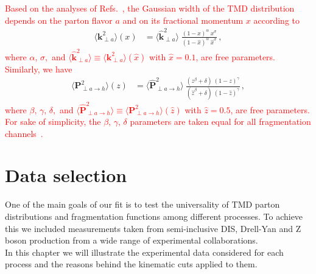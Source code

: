 \documentclass[aps,preprintnumbers,showpacs,nofootinbib,superscriptaddress,floatfix]{revtex4}
\newcommand{\T}{\perp}
\begin{document}
\textcolor{red}{Based on the analyses of Refs.~\cite{Signori:2013mda,Bacchetta:2015ora}, the Gaussian width of the TMD distribution depends on the parton flavor $a$ and on its fractional momentum $x$ according to}
\begin{align} 
\big\langle \bm{k}_{\T a}^2 \big\rangle (x) &= \big\langle \hat{\bm{k}}_{\T a}^2 \big\rangle \;  
\frac{(1-x)^{\alpha} \  x^{\sigma} }{ (1 - \hat{x})^{\alpha} \  \hat{x}^{\sigma} } \, ,
\label{e:kT2_kin}
\end{align}
\textcolor{red}{where $\alpha, \, \sigma,$ and $\big\langle \hat{\bm{k}}_{\T a}^2 \big\rangle \equiv \big\langle \bm{k}_{\T a}^2 \big\rangle (\hat{x})$ with $\hat{x} = 0.1$, are free parameters. Similarly, we have}
\begin{align}  
\big\langle \bm{P}_{\T a \to h}^2 \big\rangle (z) &= \big\langle \hat{\bm{P}}_{\T a \to h}^2 \big\rangle \  
               \frac{ (z^{\beta} + \delta)\ (1-z)^{\gamma} }{ (\hat{z}^{\beta} + \delta)\   (1 - \hat{z})^{\gamma} } \, ,
 \label{e:PT2_kin}
 \end{align}
 \textcolor{red}{where $\beta, \, \gamma, \, \delta, $ and $\big\langle \hat{\bm{P}}_{\T a \to h}^2 \big\rangle \equiv \big \langle \bm{P}_{\T a \to h}^2 \big\rangle (\hat{z})$ with $\hat{z} = 0.5$, are free parameters. For sake of simplicity, the $\beta, \, \gamma, \, \delta$ parameters are taken equal for all fragmentation channels~\cite{Signori:2013mda,Bacchetta:2015ora}. }

\section{Data selection}
\label{s:data}

One of the main goals of our fit is to test the universality of TMD parton distributions and fragmentation functions among different processes.
To achieve this we included measurements taken from semi-inclusive DIS, Drell-Yan and Z boson production from a wide range of experimental collaborations.\\
In this chapter we will illustrate the experimental data considered for each process and the reasons behind the kinematic cuts applied to them.\\
\end{document}

